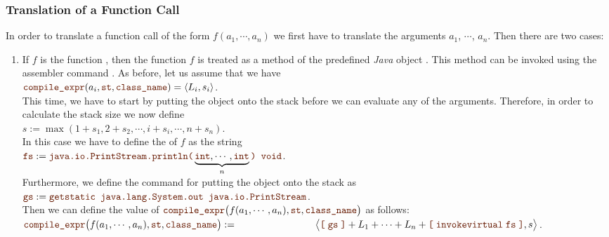 \subsubsection{Translation of a Function Call}
In order to translate a function call of the form  $f(a_1, \cdots, a_n)$ we first have to translate the
arguments $a_1$, $\cdots$, $a_n$.  Then there are two cases:
\begin{enumerate}
\item If $f$ is the function , then the function $f$ is treated as a method of the
      predefined \textsl{Java} object .
      This method can be invoked using the assembler command
      .  As before, let us assume that we have
      \\[0.2cm]
      \hspace*{1.3cm}
      $\mytt{compile\_expr}(a_i, \mytt{st}, \mytt{class\_name}) = \pair(L_i, s_i)$.
      \\[0.2cm]
      This time, we have to start by putting the object  onto the stack before we
      can evaluate any of the arguments.  Therefore, in order to calculate the stack size we now define
      \\[0.2cm]
      \hspace*{1.3cm}
      $s := \max(1 + s_1, 2 + s_2, \cdots, i + s_i, \cdots, n + s_n)$.
      \\[0.2cm]
      In this case we have to define the   of $f$ as the string
      \\[0.2cm]
      \hspace*{1.3cm}
      $\mytt{fs} := \mytt{java.io.PrintStream.println(}\underbrace{\mytt{int},\cdots,\mytt{int}}_{n}\mytt{) void}$.
      \\[0.2cm]
      Furthermore, we define the command  for putting the object  onto the
      stack as 
      \\[0.2cm]
      \hspace*{1.3cm}
      $\mytt{gs} :=  \mytt{getstatic java.lang.System.out java.io.PrintStream}$.
      \\[0.2cm]
      Then we can define the
      value of
      $\mytt{compile\_expr}\bigl(f(a_1,\cdots,a_n), \mytt{st}, \mytt{class\_name}\bigr)$ as follows:
      \\[0.2cm]
      \hspace*{1.3cm}
      $\mytt{compile\_expr}\bigl(f(a_1,\cdots,a_n), \mytt{st}, \mytt{class\_name}\bigr) := \\[0.1cm]
      \hspace*{2.8cm} \bigl\langle \mytt{[} \;\mytt{gs} \;\mytt{]} + L_1 + \cdots + L_n +
      \mytt{[} \; \mytt{invokevirtual}\; \mytt{fs} \;\mytt{]}, s\bigr\rangle$.


\end{enumerate}

